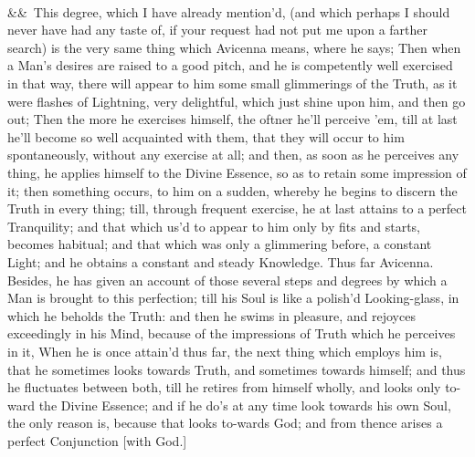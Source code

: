 \documentclass[12pt]{article}
\newcommand{\para}[1][]{\par\noindent\ifx&#1&\else\textsuperscript{\footnotesize #1}~\fi}
\begin{document}
\para This degree, which I have already mention'd, (and which perhaps I should never have had any taste of, if your request had not put me upon a farther search) is the very same thing which Avicenna means, where he says; Then when a Man's desires are raised to a good pitch, and he is competently well exercised in that way, there will appear to him some small glimmerings of the Truth, as it were flashes of Lightning, very delightful, which just shine upon him, and then go out; Then the more he exercises himself, the oftner he'll perceive 'em, till at last he'll become so well acquainted with them, that they will occur to him spontaneously, without any exercise at all; and then, as soon as he perceives any thing, he applies himself to the Divine Essence, so as to retain some impression of it; then something occurs, to him on a sudden, whereby he begins to discern the Truth in every thing; till, through frequent exercise, he at last attains to a perfect Tranquility; and that which us'd to appear to him only by fits and starts, becomes habitual; and that which was only a glimmering before, a constant Light; and he obtains a constant and steady Knowledge. Thus far Avicenna. Besides, he has given an account of those several steps and degrees by which a Man is brought to this perfection; till his Soul is like a polish'd Looking-glass, in which he beholds the Truth: and then he swims in pleasure, and rejoyces exceedingly in his Mind, because of the impressions of Truth which he perceives in it, When he is once attain'd thus far, the next thing which employs him is, that he sometimes looks towards Truth, and sometimes towards himself; and thus he fluctuates between both, till he retires from himself wholly, and looks only to-ward the Divine Essence; and if he do's at any time look towards his own Soul, the only reason is, because that looks to-wards God; and from thence arises a perfect Conjunction [with God.]
\end{document}
